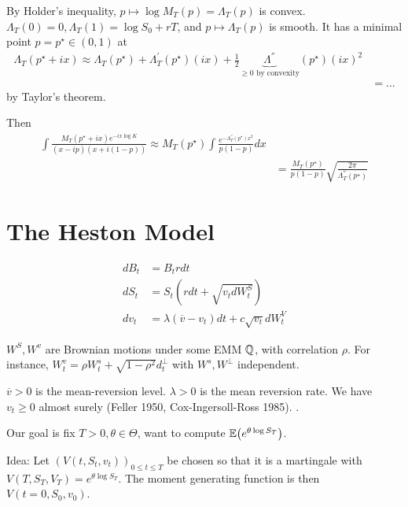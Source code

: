 \begin{remark}
  By Holder's inequality, $p \mapsto \log M_{T}(p) = \Lambda_{T}(p)$ is
  convex.  $\Lambda_{T}(0) = 0, \Lambda_{T}(1) = \log S_{0} + rT$, and
  $p \mapsto \Lambda_{T}(p)$ is smooth.  It has a minimal point $p =
  p^{\star} \in (0, 1)$ at
  \begin{align}
    \label{eq:123}
    \Lambda_{T}(p^{\star} + ix) \approx \Lambda_{T}(p^{\star}) +
    \Lambda_{T}^{'}(p^{\star})(ix) + \frac{1}{2}
    \underbrace{\Lambda^{''}}_{\text{$\geq 0$ by convexity}}(p^{\star})(ix)^{2} \\
    &= ...
  \end{align}  by Taylor's theorem.

  Then
  \begin{align}
    \label{eq:124}
    \int \frac{M_{T}(p^{\star} + ix) e^{-ix \log K}}{(x - ip)(x +
      i(1-p))} \approx M_{T}(p^{\star}) \int
    \frac{e^{-\Lambda_{T}^{''}(p^{\star}) x^{2}}}{p(1-p)} dx \\
    &= \frac{M_{T}(p^{\star})}{p(1-p)} \sqrt{\frac{2\pi}{\Lambda_{T}^{''}(p^{\star})}}
  \end{align}
\end{remark}

\section{The Heston Model}
\label{sec:heston-model}



\begin{align}
  \label{eq:125}
  dB_{t} &= B_{t} r dt \\
  dS_{t} &= S_{t} (r dt + \sqrt{v_{t} dW_{t}^{S}}) \\
  dv_{t} &= \lambda (\overline v - v_{t}) dt + c \sqrt{v_{t}}
  dW^{V}_{t}
\end{align}

$W^{S}, W^{v}$ are Brownian motions under some EMM $\Q$, with
correlation $\rho$.  For instance, $W_{t}^{v} = \rho W_{t}^{s} +
\sqrt{1-\rho^{2}} d_{t}^{\perp}$ with $W^{s}, W^{\perp}$ independent.

$\overline v > 0$ is the mean-reversion level.  $\lambda > 0$ is the
mean reversion rate.  We have $v_{t} \geq 0$ almost surely (Feller
1950, Cox-Ingersoll-Ross 1985).  \citet{cox1985theory}.

Our goal is fix $T > 0, \theta \in \Theta$, want to compute
$\E{e^{\theta \log S_{T}}}$. 

Idea: Let $(V(t, S_{t}, v_{t}))_{0 \leq t \leq T}$ be chosen so that
it is a martingale with $V(T, S_{T}, V_{T}) = e^{\theta \log S_{T}}$.
The moment generating function is then $V(t=0, S_{0}, v_{0})$.

